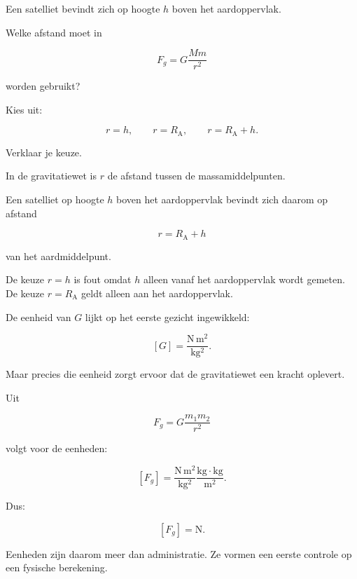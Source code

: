 \documentclass{ximera}
\begin{document}
\begin{oefening}{\oefB\ESS}

Een satelliet bevindt zich op hoogte $h$ boven het aardoppervlak.

Welke afstand moet in

\[
F_g=G\frac{Mm}{r^2}
\]

worden gebruikt?

Kies uit:

\[
r=h,
\qquad
r=R_\mathrm A,
\qquad
r=R_\mathrm A+h.
\]

Verklaar je keuze.


\begin{oplossing}

In de gravitatiewet is $r$ de afstand tussen de massamiddelpunten.

Een satelliet op hoogte $h$ boven het aardoppervlak bevindt zich daarom
op afstand

\[
\boxed{
r=R_\mathrm A+h
}
\]

van het aardmiddelpunt.

De keuze $r=h$ is fout omdat $h$ alleen vanaf het aardoppervlak wordt
gemeten. De keuze $r=R_\mathrm A$ geldt alleen aan het aardoppervlak.

\end{oplossing}

\end{oefening}




De eenheid van $G$ lijkt op het eerste gezicht ingewikkeld:

\[
[G]
=
\mathrm{\frac{N\,m^2}{kg^2}}.
\]

Maar precies die eenheid zorgt ervoor dat de gravitatiewet een kracht
oplevert.

Uit

\[
F_g
=
G\frac{m_1m_2}{r^2}
\]

volgt voor de eenheden:

\[
[F_g]
=
\mathrm{
\frac{N\,m^2}{kg^2}
\frac{kg\cdot kg}{m^2}
}.
\]

Dus:

\[
\boxed{
[F_g]=\mathrm N.
}
\]

Eenheden zijn daarom meer dan administratie. Ze vormen een eerste
controle op een fysische berekening.
\end{document}
